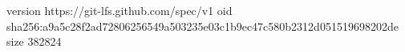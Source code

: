 version https://git-lfs.github.com/spec/v1
oid sha256:a9a5c28f2ad72806256549a503235e03c1b9ec47c580b2312d051519698202de
size 382824
